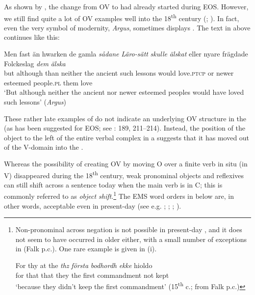 \documentclass[output=paper]{langscibook}
\begin{document}
As shown by \citet{Delsing1999}, the change from OV to  had already started during EOS. However, we still find quite a lot of OV examples well into the 18\textsuperscript{th} century (\citealt{Petzell2011}; \citealt{Sangfelt2019}). In fact, even the very symbol of modernity, \textit{Argus}, sometimes displays . The text in  above continues like this:


\ea
\gll Men  fast      än   hwarken de gamla \textit{sådane} \textit{Läro-sätt} \textit{skulle} \textit{älskat} eller   nyare     frägdade   Folckeslag \textit{dem} \textit{älska}\\
but     although   than   neither   the ancient  such       lessons    would  love\textsc{.ptcp} or  newer  esteemed people.\textsc{pl}  them love\\
\glt ‘But although neither the ancient nor newer esteemed peoples would have loved such lessons’ (\textit{Argus})
\z

These rather late examples of  do not indicate an underlying OV structure in the  (as has been suggested for EOS; see \citealt{Delsing1999}: 189, 211–214). Instead, the position of the object to the left of the entire verbal complex in a  suggests that it has moved out of the V-domain into the  \citep{Petzell2011}. 



Whereas the possibility of creating OV by moving O over a finite verb in situ (in V) disappeared during the 18\textsuperscript{th} century, weak pronominal objects and reflexives can still shift across a sentence  today when the main verb is in C; this is commonly referred to as \textit{object shift}.\footnote{Non-pronominal
     across negation is not possible in present-day , and it does not seem to have occurred in older  either, with a small number of exceptions in  (Falk p.c.). One rare example is given in (i).

    \ea
    \gll  For thy at   the \textit{thz} \textit{första} \textit{bodhordh} \textit{ekke} hioldo\\
        for that that   they   the first   commandment   not   kept\\
        \glt ‘because they didn’t keep the first commandment’ (15\textsuperscript{th} c.; from Falk p.c.)
    \z
    }
The EMS word orders in  below are, in other words, acceptable even in present-day  (see e.g. \citealt{Holmberg1986}; \citealt{Andreasson2008}; \citealt{Bentzen2014}; \citealt{Erteschik-ShirJosefsson2017}).
\end{document}
